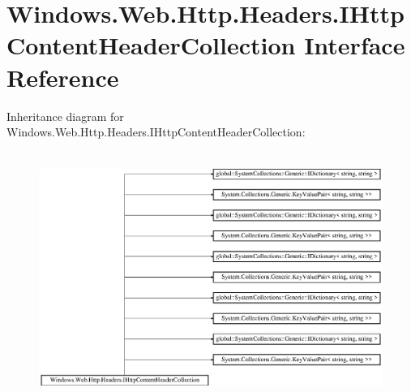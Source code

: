 \hypertarget{interface_windows_1_1_web_1_1_http_1_1_headers_1_1_i_http_content_header_collection}{}\section{Windows.\+Web.\+Http.\+Headers.\+I\+Http\+Content\+Header\+Collection Interface Reference}
\label{interface_windows_1_1_web_1_1_http_1_1_headers_1_1_i_http_content_header_collection}
Inheritance diagram for Windows.\+Web.\+Http.\+Headers.\+I\+Http\+Content\+Header\+Collection\+:\begin{figure}[H]
\begin{center}
\leavevmode
\includegraphics[height=8.213333cm]{interface_windows_1_1_web_1_1_http_1_1_headers_1_1_i_http_content_header_collection}
\end{center}
\end{figure}

